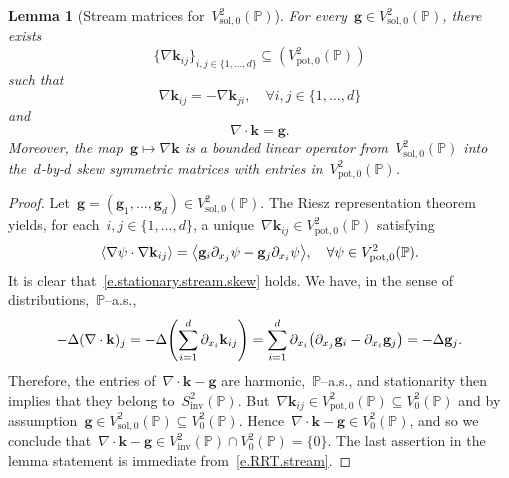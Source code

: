 \documentclass[11pt,twoside]{article} %
\numberwithin{equation}{section}
\newtheorem{lemma}[theorem]{Lemma}
\theoremstyle{definition}
\let\originalleft\left
\let\originalright\right
\renewcommand{\left}{\mathopen{}\mathclose\bgroup\originalleft}
\renewcommand{\right}{\aftergroup\egroup\originalright}
\newcommand{\g}{\mathbf{g}}
\newcommand{\pot}{\mathrm{pot}}
\newcommand{\sol}{\mathrm{sol}}
\newcommand{\inv}{\mathrm{inv}}
\renewcommand{\P}{\mathbb{P}}
\begin{document}
\begin{lemma}[Stream matrices for~$V^2_{\sol,0}(\P)$]
\label{l.stationary.stream}
For every~$\g\in V^2_{\sol,0}(\P)$, there exists
$$\{ \nabla \mathbf{k}_{ij} \}_{i,j\in\{1,\ldots,d\}} \subseteq (V^2_{\pot,0}(\P))$$
such that
\begin{equation}
\label{e.stationary.stream.skew}
\nabla \mathbf{k}_{ij} = -\nabla \mathbf{k}_{ji}, \quad \forall i,j\in\{1,\ldots,d\}
\end{equation}
and 
\begin{equation}
\label{e.divkg}
\nabla \cdot \mathbf{k} = \g. 
\end{equation}
Moreover, the map~$\g \mapsto \nabla \mathbf{k}$ is a bounded linear operator from~$V^2_{\sol,0}(\P)$ into the~$d$-by-$d$ skew symmetric matrices with entries in~$V^2_{\pot,0}(\P)$.  
\end{lemma}
\begin{proof}
Let~$\g = (\g_1,\ldots,\g_d) \in V^2_{\sol,0}(\P)$. The Riesz representation theorem yields, for each~$i,j\in\{1,\ldots,d\}$, a unique~$\nabla \mathbf{k}_{ij}\in V^2_{\pot,0}(\P)$ satisfying
\begin{equation}
\label{e.RRT.stream}
\left\langle \nabla \psi\cdot \nabla \mathbf{k}_{ij}  \right\rangle 
=
\left\langle 
\g_{i} \partial_{x_j} \psi - \g_j \partial_{x_i} \psi
\right\rangle, \quad \forall \psi\in V^2_{\pot,0}(\P).
\end{equation}
It is clear that~\eqref{e.stationary.stream.skew} holds. We have, in the sense of distributions,~$\P$--a.s.,  
\begin{equation*}
-\Delta ( \nabla \cdot \mathbf{k} )_j 
= 
-\Delta\left(\sum_{i=1}^d \partial_{x_i} \mathbf{k}_{ij} \right)
=
\sum_{i=1}^d\partial_{x_i} \left( \partial_{x_j} \g_i - \partial_{x_i} \g_j \right)
=
-\Delta \g_j.
\end{equation*}
Therefore, the entries of~$\nabla \cdot \mathbf{k} - \g$ are harmonic,~$\P$--a.s., and stationarity then implies that they belong to~$S^2_{\inv}(\P)$. But~$\nabla \mathbf{k}_{ij} \in V^2_{\pot,0}(\P) \subseteq V^2_0(\P)$ and by assumption~$\g \in V^2_{\sol,0}(\P) \subseteq V^2_0(\P)$. Hence~$\nabla \cdot \mathbf{k} - \g \in V^2_{0}(\P)$, and so we conclude that~$\nabla \cdot \mathbf{k} - \g \in V^2_{\inv}(\P) \cap V^2_{0}(\P) = \{ 0 \}$. The last assertion in the lemma statement is immediate from~\eqref{e.RRT.stream}. 
\end{proof}
\end{document}

